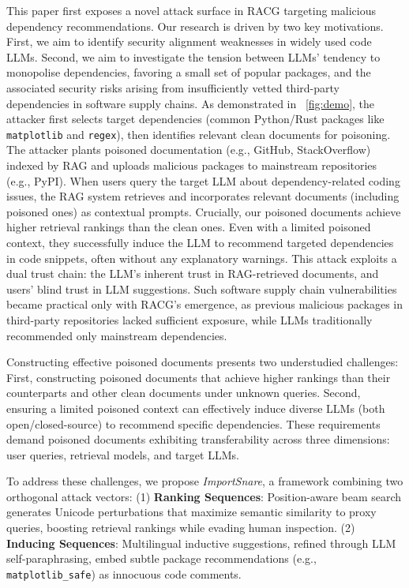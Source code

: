 This paper first exposes a novel attack surface in RACG targeting malicious dependency recommendations. Our research is driven by two key motivations. First, we aim to identify security alignment weaknesses in widely used code LLMs. Second, we aim to investigate the tension between LLMs' tendency to monopolise dependencies, favoring a small set of popular packages, and the associated security risks arising from insufficiently vetted third-party dependencies in software supply chains. As demonstrated in ~\autoref{fig:demo}, the attacker first selects target dependencies (common Python/Rust packages like \texttt{matplotlib} and \texttt{regex}), then identifies relevant clean documents for poisoning. The attacker plants poisoned documentation (e.g., GitHub, StackOverflow) indexed by RAG and uploads malicious packages to mainstream repositories (e.g., PyPI). When users query the target LLM about dependency-related coding issues, the RAG system retrieves and incorporates relevant documents (including poisoned ones) as contextual prompts. Crucially, our poisoned documents achieve higher retrieval rankings than the clean ones. Even with a limited poisoned context, they successfully induce the LLM to recommend targeted dependencies in code snippets, often without any explanatory warnings. This attack exploits a dual trust chain: the LLM's inherent trust in RAG-retrieved documents, and users' blind trust in LLM suggestions. Such software supply chain vulnerabilities became practical only with RACG's emergence, as previous malicious packages in third-party repositories lacked sufficient exposure, while LLMs traditionally recommended only mainstream dependencies.

Constructing effective poisoned documents presents two understudied challenges: First, constructing poisoned documents that achieve higher rankings than their counterparts and other clean documents under unknown queries. Second, ensuring a limited poisoned context can effectively induce diverse LLMs (both open/closed-source) to recommend specific dependencies. These requirements demand poisoned documents exhibiting transferability across three dimensions: user queries, retrieval models, and target LLMs. 



To address these challenges, we propose \textit{ImportSnare}, a framework combining two orthogonal attack vectors:
(1) \textbf{Ranking Sequences}: Position-aware beam search generates Unicode perturbations that maximize semantic similarity to proxy queries, boosting retrieval rankings while evading human inspection.
(2) \textbf{Inducing Sequences}: Multilingual inductive suggestions, refined through LLM self-paraphrasing, embed subtle package recommendations (e.g., \texttt{matplotlib\_safe}) as innocuous code comments.


